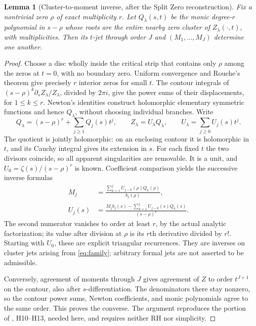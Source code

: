 \documentclass[11pt]{amsart}
\newtheorem{lemma}[theorem]{Lemma}
\theoremstyle{remark}\newtheorem{remark}[theorem]{Remark}
\begin{document}
\begin{lemma}[Cluster-to-moment inverse, after the Split Zero reconstruction]
\label{lem:cluster}
Fix a nontrivial zero $\rho$ of exact multiplicity $r$. Let $Q_\lambda(s,t)$
be the monic degree-$r$ polynomial in $s-\rho$ whose roots are the entire
nearby zero cluster of $Z_\lambda(\cdot,t)$, with multiplicities. Then its
$t$-jet through order $J$ and $(M_1,\ldots,M_J)$ determine one another.
\end{lemma}
\begin{proof}
Choose a disc wholly inside the critical strip that contains only $\rho$
among the zeros at $t=0$, with no boundary zero. Uniform convergence and
Rouche's theorem give precisely $r$ interior zeros for small $t$.
The contour integrals of
$(s-\rho)^k\partial_s Z_\lambda/Z_\lambda$, divided by $2\pi i$, give
the power sums of their displacements, for $1\le k\le r$. Newton's
identities construct holomorphic elementary symmetric functions and hence
$Q_\lambda$, without choosing individual branches. Write
\[
 Q_\lambda=(s-\rho)^r+\sum_{j\ge1}Q_j(s)t^j,\qquad
 Z_\lambda=U_\lambda Q_\lambda,\qquad
 U_\lambda=\sum_{j\ge0}U_j(s)t^j.
\]
The quotient is jointly holomorphic: on an enclosing contour it is
holomorphic in $t$, and its Cauchy integral gives its extension in $s$.
For each fixed $t$ the two divisors coincide, so all apparent singularities
are removable. It is a unit, and $U_0=\zeta(s)/(s-\rho)^r$ is known.
Coefficient comparison yields the successive inverse formulas
\begin{align}
 M_j&=\frac{\sum_{k=1}^j U_{j-k}(\rho)Q_k(\rho)}{b_j(\rho)},
 \label{eq:inverseM}\\
 U_j(s)&=\frac{M_jb_j(s)-\sum_{k=1}^j U_{j-k}(s)Q_k(s)}{(s-\rho)^r}.
 \label{eq:inverseU}
\end{align}
The second numerator vanishes to order at least $r$, by the actual analytic
factorization; its value after division at $\rho$ is its $r$th derivative
divided by $r!$. Starting with $U_0$, these are explicit triangular
recurrences. They are inverses on cluster jets arising from
\eqref{eq:family}; arbitrary formal jets are not asserted to be admissible.

Conversely, agreement of moments through $J$ gives agreement of $Z$ to
order $t^{J+1}$ on the contour, also after $s$-differentiation. The
denominators there stay nonzero, so the contour power sums, Newton
coefficients, and monic polynomials agree to the same order. This proves
the converse. The argument reproduces the portion of \cite{hurwitz},
H10--H13, needed here, and requires neither RH nor simplicity.
\end{proof}
\end{document}

